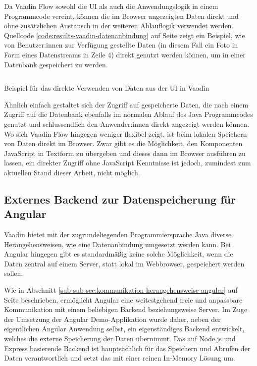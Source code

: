 \documentclass[a4paper,12pt,twoside]{scrreprt}
\begin{document}
\medskip

Da Vaadin Flow sowohl die \ac{UI} als auch die Anwendungslogik in einem Programmcode vereint, können die im Browser angezeigten Daten direkt und ohne zusätzlichen Austausch in der weiteren Ablauflogik verwendet werden. Quellcode \ref{code:results-vaadin-datenanbindung} auf Seite \pageref{code:results-vaadin-datenanbindung} zeigt ein Beispiel, wie von Benutzer:innen zur Verfügung gestellte Daten (in diesem Fall ein Foto in Form eines Datenstreams in Zeile 4) direkt genutzt werden können, um in einer Datenbank gespeichert zu werden.

\begin{listing}[ht]
    \inputminted[fontsize=\footnotesize,linenos,breaklines]{java}{code/Luidold_Results-Vaadin-Datenanbindung-CodeSample.java}
    \caption[Beispiel für das direkte Verwenden von Daten aus der \ac{UI} in Vaadin]{Beispiel für das direkte Verwenden von Daten aus der \ac{UI} in Vaadin}
    \label{code:results-vaadin-datenanbindung}
\end{listing}

Ähnlich einfach gestaltet sich der Zugriff auf gespeicherte Daten, die nach einem Zugriff auf die Datenbank ebenfalls im normalen Ablauf des Java Programmcodes genutzt und schlussendlich den Anwender:innen direkt angezeigt werden können. Wo sich Vaadin Flow hingegen weniger flexibel zeigt, ist beim lokalen Speichern von Daten direkt im Browser. Zwar gibt es die Möglichkeit, den Komponenten JavaScript in Textform zu übergeben und dieses dann im Browser ausführen zu lassen, ein direkter Zugriff ohne JavaScript Kenntnisse ist jedoch, zumindest zum aktuellen Stand dieser Arbeit, nicht möglich.

\subsection{Externes Backend zur Datenspeicherung für Angular}
\label{sub-sec:result-datenanbindung-angular}
Vaadin bietet mit der zugrundeliegenden Programmiersprache Java diverse Herangehensweisen, wie eine Datenanbindung umgesetzt werden kann. Bei Angular hingegen gibt es standardmäßig keine solche Möglichkeit, wenn die Daten zentral auf einem Server, statt lokal im Webbrowser, gespeichert werden sollen.

\medskip

Wie in Abschnitt \ref{sub-sub-sec:kommunikation-herangehensweise-angular} auf Seite \pageref{sub-sub-sec:kommunikation-herangehensweise-angular} beschrieben, ermöglicht Angular eine weitestgehend freie und anpassbare Kommunikation mit einem beliebigen Backend beziehungsweise Server. Im Zuge der Umsetzung der Angular Demo-Applikation wurde daher, neben der eigentlichen Angular Anwendung selbst, ein eigenständiges Backend entwickelt, welches die externe Speicherung der Daten übernimmt. Das auf Node.js und Express basierende Backend ist hauptsächlich für das Speichern und Abrufen der Daten verantwortlich und setzt das mit einer reinen In-Memory Lösung um.
\end{document}
